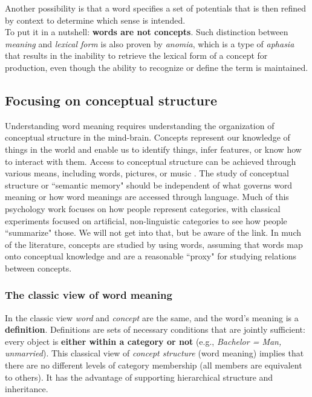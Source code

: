 Another possibility is that a word specifies a set of potentials that is then refined by context to determine which sense is intended.\\

To put it in a nutshell: \textbf{words are not concepts}. Such distinction between \textit{meaning} and \textit{lexical form} is also proven by \textit{anomia}, which is a type of \textit{aphasia} that results in the inability to retrieve the lexical form of a concept for production, even though the ability to recognize or define the term is maintained.

\subsection{Focusing on conceptual structure}
Understanding word meaning requires understanding the organization of conceptual structure in the mind-brain. Concepts represent our knowledge of things in the world and enable us to identify things, infer features, or know how to interact with them. Access to conceptual structure can be achieved through various means, including words, pictures, or music \notet. The study of conceptual structure or ``semantic memory" should be independent of what governs word meaning or how word meanings are accessed through language. Much of this psychology work focuses on how people represent categories, with classical experiments focused on artificial, non-linguistic categories to see how people ``summarize" those. We will not get into that, but be aware of the link.
In much of the literature, concepts are studied by using words, assuming that words map onto conceptual knowledge and are a reasonable ``proxy" for studying relations between concepts.


\subsubsection{The classic view of word meaning}
In the classic view \textit{word} and \textit{concept} are the same, and the word's meaning is a \textbf{definition}. Definitions are sets of necessary conditions that are jointly sufficient: every object is \textbf{either within a category or not} (e.g., \textit{Bachelor = Man, unmarried}).
This classical view of \textit{concept structure} (word meaning) implies that there are no different levels of category membership (all members are equivalent to others). It has the advantage of supporting hierarchical structure and inheritance.


